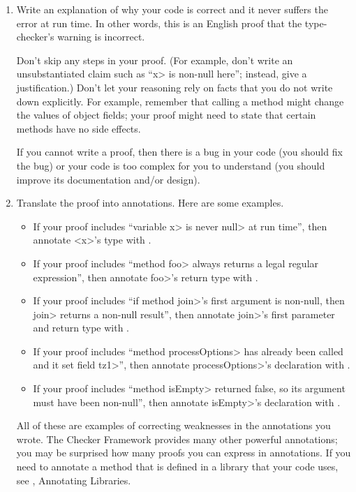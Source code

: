 \begin{enumerate}
\item
  Write an explanation of why your code is correct and it
  never suffers the error at run time.  In other words, this is an English proof
  that the type-checker's warning is incorrect.

  Don't skip any steps in your proof.
  (For example, don't write an unsubstantiated claim such as ``\<x> is
  non-null here''; instead, give a justification.)
  Don't let your reasoning rely on
  facts that you do not write down explicitly.  For example, remember that
  calling a method might change the values of object fields; your proof
  might need to state that certain methods have no side effects.

  If you cannot write a proof, then there is a bug
  in your code (you should fix the bug) or your code is too complex for you
  to understand (you should improve its documentation and/or design).

\item
  Translate the proof into annotations.  Here are some examples.

  \begin{itemize}
  \item
    If your proof includes ``variable \<x> is never \<null>
    at run time'', then annotate <x>'s type with
    .
  \item
    If your proof
    includes ``method \<foo> always returns a legal regular expression'',
    then annotate \<foo>'s return type with
    .
  \item
    If your proof includes ``if method \<join>'s first argument is
    non-null, then \<join> returns a non-null result'', then annotate
    \<join>'s first parameter and return type with
    .
  \item
    If your proof includes ``method \<processOptions> has already been called and it
    set field \<tz1>'', then annotate \<processOptions>'s declaration with
    .
  \item
    If your proof includes ``method \<isEmpty> returned false, so its
    argument must have been non-null'', then annotate \<isEmpty>'s
    declaration with
    .
  \end{itemize}
  All of these are examples of correcting weaknesses in the annotations you wrote.
  The Checker Framework provides many other powerful annotations; you may
  be surprised how many proofs you can express in annotations.
  If you need to annotate a method that is defined in a
  library that your code uses, see ,
  Annotating Libraries.


\end{enumerate}
